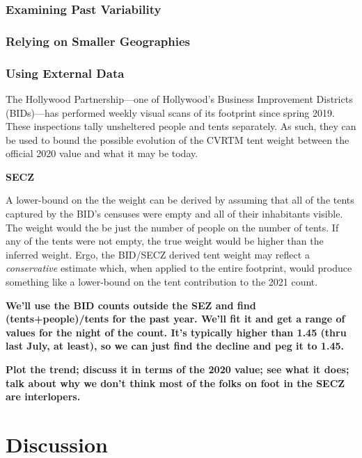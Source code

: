 \documentclass[11pt,twocolumn]{article}
\def\bfr{\bf\color{red}}
\def\Count{count}
\begin{document}
\subsubsection{Examining Past Variability}
\label{sec:pastValues}

\subsubsection{Relying on Smaller Geographies}
\label{sec:cdWts}

\subsubsection{Using External Data}
\label{sec:bidData}

The Hollywood Partnership---one of Hollywood's Business Improvement Districts (BIDs)---has performed
weekly visual scans of its footprint since spring 2019. These inspections tally unsheltered people and 
tents separately. As such, they can be used to bound the possible evolution of the CVRTM tent weight
between the official 2020 value and what it may be today.

{\bfr SECZ}

A lower-bound on the the weight can be derived by assuming that all of the tents captured by the BID's 
censuses were empty and all of their inhabitants visible. The weight would the be just the number of
people on the number of tents. If any of the tents were not empty, the true weight would be higher than
the inferred weight. Ergo, the BID/SECZ derived tent weight may reflect a {\it conservative} estimate 
which, when applied to the entire footprint, would produce something like a lower-bound on the 
tent contribution to the 2021 \Count.

{\bfr We'll use the BID counts outside the SEZ and find (tents+people)/tents for the past year. We'll
fit it and get a range of values for the night of the count. It's typically higher than 1.45 (thru last July,
at least), so we can just find the decline and peg it to 1.45.}

{\bfr Plot the trend; discuss it in terms of the 2020 value; see what it does; talk about why we don't
think most of the folks on foot in the SECZ are interlopers.}

\section{Discussion}
\label{sec:discussion}
\end{document}

